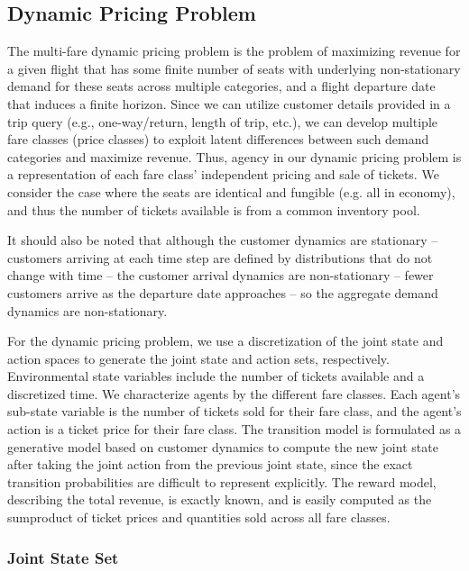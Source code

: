 \documentclass[letterpaper]{article}%
\begin{document}
\subsection{Dynamic Pricing Problem}

The multi-fare dynamic pricing problem is the problem of maximizing revenue for a given flight that has some finite number of seats with underlying non-stationary demand for these seats across multiple categories, and a flight departure date that induces a finite horizon. Since we can utilize customer details provided in a trip query (e.g., one-way/return, length of trip, etc.), we can develop multiple fare classes (price classes) to exploit latent differences between such demand categories and maximize revenue. Thus, agency in our dynamic pricing problem is a representation of each fare class' independent pricing and sale of tickets. We consider the case where the seats are identical and fungible (e.g. all in economy), and thus the number of tickets available is from a common inventory pool. 

It should also be noted that although the customer dynamics are stationary -- customers arriving at each time step are defined by distributions that do not change with time -- the customer arrival dynamics are non-stationary -- fewer customers arrive as the departure date approaches -- so the aggregate demand dynamics are non-stationary.

For the dynamic pricing problem, we use a discretization of the joint state and action spaces to generate the joint state and action sets, respectively. Environmental state variables include the number of tickets available and a discretized time. We characterize agents by the different fare classes. Each agent's sub-state variable is the number of tickets sold for their fare class, and the agent's action is a ticket price for their fare class. The transition model is formulated as a generative model based on customer dynamics to compute the new joint state after taking the joint action from the previous joint state, since the exact transition probabilities are difficult to represent explicitly. The reward model, describing the total revenue, is exactly known, and is easily computed as the sumproduct of ticket prices and quantities sold across all fare classes.

\subsubsection{Joint State Set} 
\end{document}
